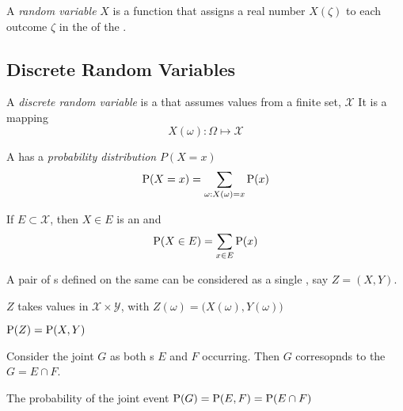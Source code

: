 \begin{definition}\label{def:Random_Variable}
  A \emph{random variable} $X$ is a function that assigns a real number $X(\zeta)$ to each outcome $\zeta$ in the  of the .
\end{definition}

\subsection{Discrete Random Variables}\label{subsec:Discrete_Random_Variables}
\begin{definition}\label{def:Discrete_Random_Variable}
  A \emph{discrete random variable} is a  that assumes values from a finite set, $\mathcal{X}$
  It is a mapping
  \begin{equation}\label{eq:Discrete_Random_Variable}
    X(\omega) : \Omega \mapsto \mathcal{X}
  \end{equation}
\end{definition}

\begin{definition}\label{def:Probability_Distribution}
  A  has a \emph{probability distribution} $P(X=x)$
  \begin{equation}\label{eq:Probability_Distribution}
    \operatorname{\operatorname{P}}(X=x) = \sum\limits_{\omega : X(\omega) = x} \operatorname{\operatorname{P}}(x)
  \end{equation}

  If $E \subset \mathcal{X}$, then $X \in E$ is an  and
  \begin{equation}\label{eq:7}
    \operatorname{\operatorname{P}}(X \in E) = \sum\limits_{x \in E} \operatorname{\operatorname{P}}(x)
  \end{equation}
\end{definition}

\begin{propertylist}
\item A pair of s defined on the same  can be considered as a single , say $Z = (X,Y)$.
\item $Z$ takes values in $\mathcal{X} \times \mathcal{Y}$, with $Z(\omega) = \bigl( X(\omega), Y(\omega) \bigr)$
\item $\operatorname{\operatorname{P}}(Z) = \operatorname{\operatorname{P}}(X,Y)$
\item Consider the joint  $G$ as both s $E$ and $F$ occurring. Then $G$ corresopnds to the  $G = E \cap F$.
\item The probability of the joint event $\operatorname{\operatorname{P}}(G) = \operatorname{\operatorname{P}}(E,F) = \operatorname{\operatorname{P}}(E \cap F)$
\end{propertylist}

